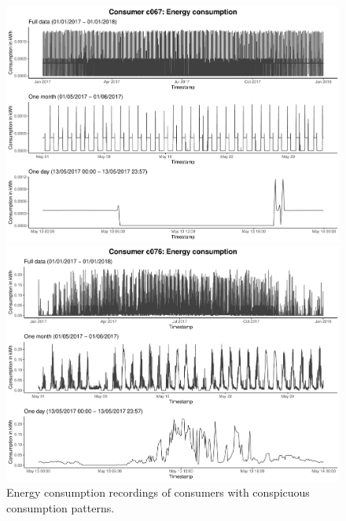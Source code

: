 \begin{figure}
    \begin{minipage}[ht]{\dimexpr.5\textheight-0.15em}
    \includegraphics[width=\textwidth]{thesis/graphs/timeseries/c067_cons.pdf}
    \end{minipage}
    \begin{minipage}[ht]{\dimexpr.5\textheight-0.15em}
    \includegraphics[width=\textwidth]{thesis/graphs/timeseries/c076_cons.pdf}
    \end{minipage}
    
    \caption[Energy consumption recordings of consumers with conspicuous consumption patterns]{Energy consumption recordings of consumers with conspicuous consumption patterns.}
    \label{Fig:consenergycons_peculiar}
\end{figure}

